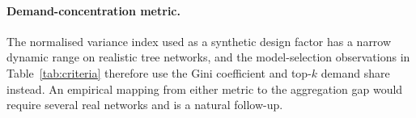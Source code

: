 \paragraph{Demand-concentration metric.}
The normalised variance index used as a synthetic design factor has a narrow dynamic range
on realistic tree networks, and the model-selection observations in
Table~\ref{tab:criteria} therefore use the Gini coefficient and top-$k$ demand share
instead. An empirical mapping from either metric to the aggregation gap would require
several real networks and is a natural follow-up.
